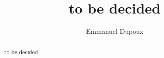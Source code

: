 \documentclass{article}
\title{to be decided}
\author{Emmanuel Dupoux}
\date{}
\begin{document}
\maketitle
\thispagestyle{empty}
\begin{abstract}
to be decided
\end{abstract}
\end{document}
